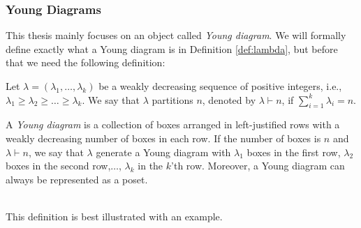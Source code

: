 \subsubsection{Young Diagrams}
This thesis mainly focuses on an object called \emph{Young diagram}. We will formally define exactly what a Young diagram is in Definition \ref{def:lambda}, but before that we need the following definition:
\begin{defn}
\label{def:lambda}
Let $\lambda=(\lambda_1,\dots,\lambda_k)$ be a weakly decreasing sequence of positive integers, i.e., $\lambda_1\ge \lambda_2\ge\dots\ge \lambda_k$. We say that $\lambda$ partitions $n$, denoted by $\lambda\vdash n$, if $\sum_{i=1}^k\lambda_i =n$.
\end{defn}
\begin{defn}
A \emph{Young diagram} is a collection of boxes arranged in left-justified rows with a weakly decreasing number of boxes in each row. If the number of boxes is $n$ and $\lambda\vdash n$, we say that $\lambda$ generate a Young diagram with $\lambda_1$ boxes in the first row, $\lambda_2$ boxes in the second row,$\dots$, $\lambda_k$ in the $k$'th row.
Moreover, a Young diagram can always be represented as a poset.
\end{defn}
~\\
This definition is best illustrated with an example. 
